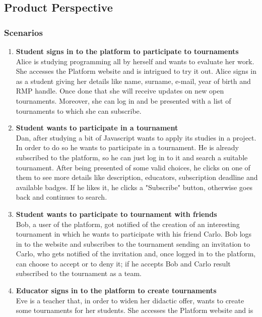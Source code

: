 \subsection{Product Perspective}

\subsubsection{Scenarios}
\begin{enumerate}[label=$\bullet$ \textbf{SC\arabic*:}]
    \item \textbf{Student signs in to the platform to participate to tournaments}\\ Alice is studying programming all by herself and wants to evaluate her work. She accesses the Platform website and is intrigued to try it out. 
    Alice signs in as a student giving her details like name, surname, e-mail,  year of birth and RMP handle. Once done that she will receive updates on new open tournaments. Moreover, she can log in and be presented with a list 
    of tournaments to which she can subscribe.
    \item \textbf{Student wants to participate in a tournament}\\ Dan, after studying a bit of Javascript wants to apply its studies in a project. In order to do so he wants to participate in a tournament. He is already subscribed 
    to the platform, so he can just log in to it and search a suitable tournament. After being presented of some valid choices, he clicks on one of them to see more details like description, educators, subscription deadline and 
    available badges. If he likes it, he clicks a "Subscribe" button, otherwise goes back and continues to search.
    \item \textbf{Student wants to participate to tournament with friends}\\ Bob, a user of the platform, got notified of the creation of an interesting tournament in which he wants to participate with his friend Carlo. Bob logs in 
    to the website and subscribes to the tournament sending an invitation to Carlo, who gets notified of the invitation and, once logged in to the platform, can choose to accept or to deny it; if he accepts Bob and Carlo result 
    subscribed to the tournament as a team.
    \item \textbf{Educator signs in to the platform to create tournaments}\\ Eve is a teacher that, in order to widen her didactic offer, wants to create some tournaments for her students. She accesses the Platform website and is 

\end{enumerate}
